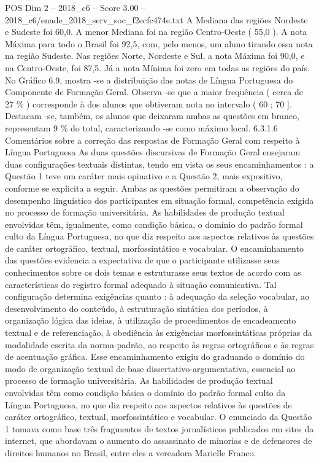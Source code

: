 \begin{textsample}{POS Dim 2 – 2018\_c6 – Score 3.00 – 2018\_c6/enade\_2018\_serv\_soc\_f2ecfc474e.txt}
A Mediana das regiões Nordeste e Sudeste foi 60,0.
A menor Mediana foi na região Centro-Oeste ( 55,0 ).
A nota Máxima para todo o Brasil foi 92,5, com, pelo menos, um aluno tirando essa nota na região Sudeste.
Nas regiões Norte, Nordeste e Sul, a nota Máxima foi 90,0, e na Centro-Oeste, foi 87,5.
Já a nota Mínima foi zero em todas as regiões do país.
No Gráfico 6.9, mostra -se a distribuição das notas de Língua Portuguesa do Componente de Formação Geral.
Observa -se que a maior frequência ( cerca de 27 \% ) corresponde à dos alunos que obtiveram nota no intervalo ( 60 ; 70 ].
Destacam -se, também, os alunos que deixaram ambas as questões em branco, representam 9 \% do total, caracterizando -se como máximo local. 6.3.1.6 Comentários sobre a correção das respostas de Formação Geral com respeito à Língua Portuguesa As duas questões discursivas de Formação Geral ensejaram duas configurações textuais distintas, tendo em vista os seus encaminhamentos : a Questão 1 teve um caráter mais opinativo e a Questão 2, mais expositivo, conforme se explicita a seguir.
Ambas as questões permitiram a observação do desempenho linguístico dos participantes em situação formal, competência exigida no processo de formação universitária.
As habilidades de produção textual envolvidas têm, igualmente, como condição básica, o domínio do padrão formal culto da Língua Portuguesa, no que diz respeito aos aspectos relativos às questões de caráter ortográfico, textual, morfossintático e vocabular.
O encaminhamento das questões evidencia a expectativa de que o participante utilizasse seus conhecimentos sobre os dois temas e estruturasse seus textos de acordo com as características do registro formal adequado à situação comunicativa.
Tal configuração determina exigências quanto : à adequação da seleção vocabular, ao desenvolvimento do conteúdo, à estruturação sintática dos períodos, à organização lógica das ideias, à utilização de procedimentos de encadeamento textual e de referenciação, à obediência às exigências morfossintáticas próprias da modalidade escrita da norma-padrão, ao respeito às regras ortográficas e às regras de acentuação gráfica.
Esse encaminhamento exigiu do graduando o domínio do modo de organização textual de base dissertativo-argumentativa, essencial ao processo de formação universitária.
As habilidades de produção textual envolvidas têm como condição básica o domínio do padrão formal culto da Língua Portuguesa, no que diz respeito aos aspectos relativos às questões de caráter ortográfico, textual, morfossintático e vocabular.
O enunciado da Questão 1 tomava como base três fragmentos de textos jornalísticos publicados em sites da internet, que abordavam o aumento do assassinato de minorias e de defensores de direitos humanos no Brasil, entre eles a vereadora Marielle Franco.

\end{textsample}
